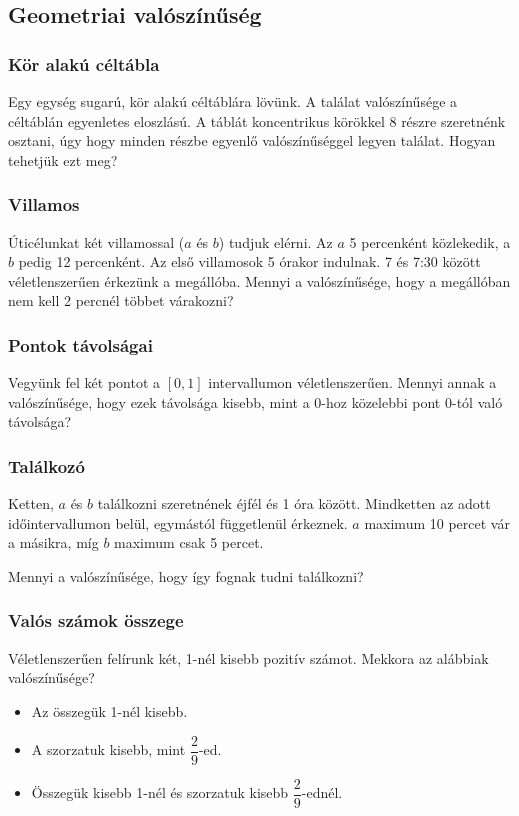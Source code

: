 \documentclass[a4paper]{article}
\begin{document}
\subsection{Geometriai valószínűség}

\subsubsection{Kör alakú céltábla}

Egy egység sugarú, kör alakú céltáblára lövünk.
A találat valószínűsége a céltáblán egyenletes eloszlású.
A táblát koncentrikus körökkel 8 részre szeretnénk osztani, úgy hogy minden részbe egyenlő valószínűséggel legyen találat.
Hogyan tehetjük ezt meg?

\subsubsection{Villamos}

Úticélunkat két villamossal ($a$ és $b$) tudjuk elérni.
Az $a$ 5 percenként közlekedik, a $b$ pedig 12 percenként.
Az első villamosok 5 órakor indulnak.
7 és 7:30 között véletlenszerűen érkezünk a megállóba.
Mennyi a valószínűsége, hogy a megállóban nem kell 2 percnél többet várakozni?

\subsubsection{Pontok távolságai}

Vegyünk fel két pontot a $[0, 1]$ intervallumon véletlenszerűen.
Mennyi annak a valószínűsége, hogy ezek távolsága kisebb, mint a 0-hoz közelebbi pont 0-tól való távolsága?

\subsubsection{Találkozó}

Ketten, $a$ és $b$ találkozni szeretnének éjfél és 1 óra között.
Mindketten az adott időintervallumon belül, egymástól függetlenül érkeznek.
$a$ maximum 10 percet vár a másikra, míg $b$ maximum csak 5 percet.

Mennyi a valószínűsége, hogy így fognak tudni találkozni?

\subsubsection{Valós számok összege}

Véletlenszerűen felírunk két, 1-nél kisebb pozitív számot.
Mekkora az alábbiak valószínűsége?
\begin{itemize}
\item Az összegük 1-nél kisebb.
\item A szorzatuk kisebb, mint $\dfrac{2}{9}$-ed.
\item Összegük kisebb 1-nél és szorzatuk kisebb $\dfrac{2}{9}$-ednél.
\end{itemize}
\end{document}
